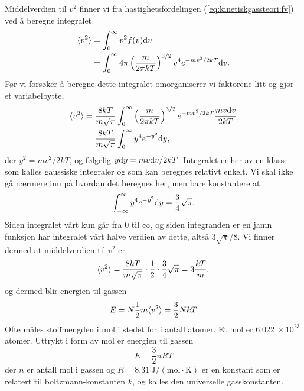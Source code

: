 Middelverdien til $v^2$ finner vi fra hastighetsfordelingen (\ref{eq:kinetiskgassteori:fv}) ved å beregne integralet
\begin{displaymath}
\begin{aligned}
	\langle v^2 \rangle &= \int_0^\infty v^2 f(v) \text{d} v \\
	&= \int_0^\infty 4\pi\left(\frac{m}{2\pi kT}\right)^{3/2} v^4 e^{-mv^2/2kT}\text{d} v.
\end{aligned}
\end{displaymath}
Før vi forsøker å beregne dette integralet omorganiserer vi faktorene litt og gjør et variabelbytte,
\begin{displaymath}
\begin{aligned}
	\langle v^2 \rangle &= \frac{8kT}{m\sqrt{\pi}} \int_0^\infty \left(\frac{m}{2\pi kT}\right)^{3/2}  e^{-mv^2/2kT}\frac{mv\text{d} v}{2kT} \\
	&=  \frac{8kT}{m\sqrt{\pi}} \int_0^\infty y^4 e^{-y^2} \text{d} y,
\end{aligned}
\end{displaymath}
der $y^2 = mv^2/2kT$, og følgelig $y\text{d} y = mv\text{d} v/2kT$. Integralet er her av en klasse som kalles gaussiske integraler og som kan beregnes relativt enkelt. Vi skal ikke gå nærmere inn på hvordan det beregnes her, men bare konstantere at
\begin{displaymath}
	\int_{-\infty}^\infty y^4e^{-y^2} \text{d} y = \frac{3}{4}\sqrt{\pi}.
\end{displaymath}
Siden integralet vårt kun går fra $0$ til $\infty$, og siden integranden er en jamn funksjon har integralet vårt halve verdien av dette, altså $3\sqrt{\pi}/8$. Vi finner dermed at middelverdien til $v^2$ er
\begin{displaymath}
	\langle v^2 \rangle = \frac{8kT}{m\sqrt{\pi}}\cdot\frac{1}{2}\cdot\frac{3}{4}\sqrt{\pi} = 3\frac{kT}{m}.
\end{displaymath}
og dermed blir energien til gassen 
\begin{equation}
\label{eq:kinetiskgassteori:Eideellgass}
	E = N\frac{1}{2} m\langle v^2 \rangle = \frac{3}{2}NkT
\end{equation}
Ofte måles stoffmengden i mol i stedet for i antall atomer. Et mol er $6.022~\times10^23$ atomer. Uttrykt i form av mol er energien til gassen 
\begin{equation}
\label{eq:kinetiskgassteori:EideellgassMol}
	E = \frac{3}{2}nRT
\end{equation}
der $n$ er antall mol i gassen og $R = 8.31~\mathrm{J/(mol\cdot K)}$ er en konstant som er relatert til boltzmann-konstanten $k$, og kalles den universelle gasskonstanten.	

